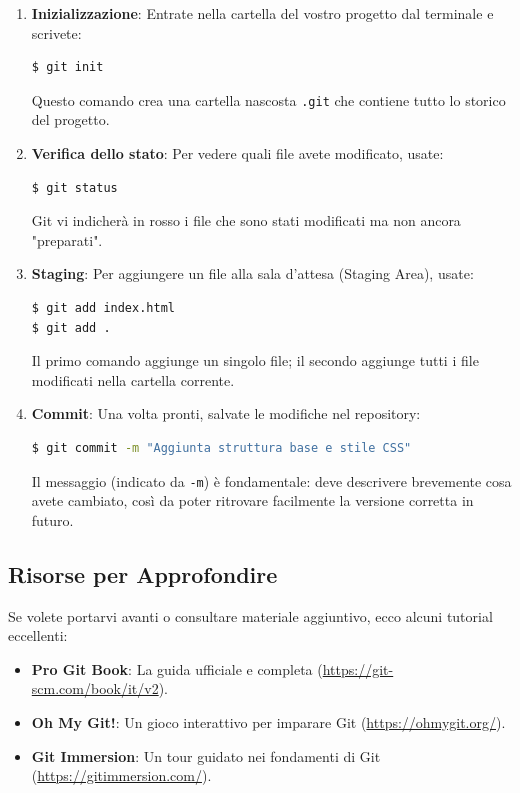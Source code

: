 \documentclass[11pt,a4paper]{report}
\begin{document}
\begin{enumerate}
    \item \textbf{Inizializzazione}: Entrate nella cartella del vostro progetto dal terminale e scrivete:
    \begin{lstlisting}[language=bash]
$ git init
    \end{lstlisting}
    Questo comando crea una cartella nascosta \texttt{.git} che contiene tutto lo storico del progetto.

    \item \textbf{Verifica dello stato}: Per vedere quali file avete modificato, usate:
    \begin{lstlisting}[language=bash]
$ git status
    \end{lstlisting}
    Git vi indicherà in rosso i file che sono stati modificati ma non ancora "preparati".

    \item \textbf{Staging}: Per aggiungere un file alla sala d'attesa (Staging Area), usate:
    \begin{lstlisting}[language=bash]
$ git add index.html
$ git add .
    \end{lstlisting}
    Il primo comando aggiunge un singolo file; il secondo aggiunge tutti i file modificati nella cartella corrente.

    \item \textbf{Commit}: Una volta pronti, salvate le modifiche nel repository:
    \begin{lstlisting}[language=bash]
$ git commit -m "Aggiunta struttura base e stile CSS"
    \end{lstlisting}
    Il messaggio (indicato da \texttt{-m}) è fondamentale: deve descrivere brevemente cosa avete cambiato, così da poter ritrovare facilmente la versione corretta in futuro.
\end{enumerate}

\subsection{Risorse per Approfondire}
Se volete portarvi avanti o consultare materiale aggiuntivo, ecco alcuni tutorial eccellenti:
\begin{itemize}
    \item \textbf{Pro Git Book}: La guida ufficiale e completa (\url{https://git-scm.com/book/it/v2}).
    \item \textbf{Oh My Git!}: Un gioco interattivo per imparare Git (\url{https://ohmygit.org/}).
    \item \textbf{Git Immersion}: Un tour guidato nei fondamenti di Git (\url{https://gitimmersion.com/}).
\end{itemize}
\end{document}
